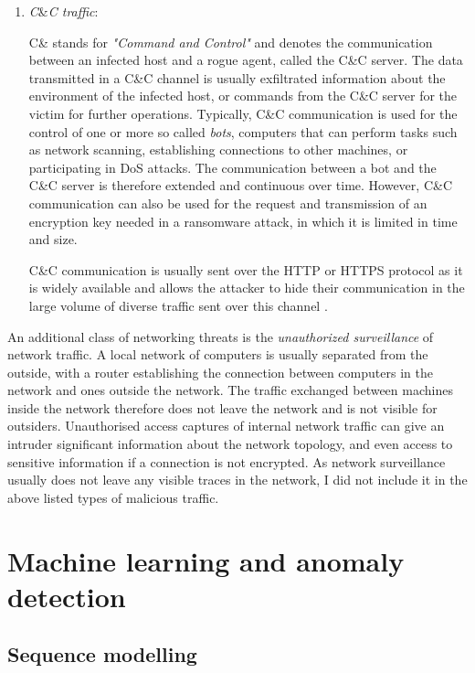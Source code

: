 \begin{enumerate}
\item \textit{C}\&\textit{C traffic}: 

C\& stands for \textit{"Command and Control"} and denotes the communication between an infected host and a rogue agent, called the C\&C server. The data transmitted in a C\&C channel is usually exfiltrated information about the environment of the infected host, or commands from the C\&C server for the victim for further operations. Typically, C\&C communication is used for the control of one or more so called \textit{bots}, computers that can perform tasks such as network scanning, establishing connections to other machines, or participating in DoS attacks. The communication between a bot and the C\&C server is therefore extended and continuous over time. However, C\&C communication can also be used for the request and transmission of an encryption key needed in a ransomware attack, in which it is limited in time and size. 

C\&C communication is usually sent over the HTTP or HTTPS protocol as it is widely available and allows the attacker to hide their communication in the large volume of diverse traffic sent over this channel \cite{lamprakis2017unsupervised}.

\end{enumerate}

An additional class of networking threats is the \textit{unauthorized surveillance} of network traffic. A local network of computers is usually separated from the outside, with a router establishing the connection between computers in the network and ones outside the network. The traffic exchanged between machines inside the network therefore does not leave the network and is not visible for outsiders. Unauthorised access captures of internal network traffic can give an intruder significant information about the network topology, and even access to sensitive information if a connection is not encrypted. As network surveillance usually does not leave any visible traces in the network, I did not include it in the above listed types of malicious traffic. 




\section{Machine learning and anomaly detection}

\subsection{Sequence modelling}

